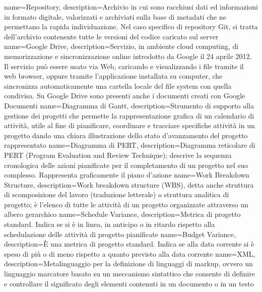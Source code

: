  {
	name=Repository,
	description={Archivio in cui sono racchiusi dati ed informazioni in formato digitale,
	valorizzati e archiviati sulla base di metadati che ne permettano la rapida individuazione.
	Nel caso specifico di repository Git, si tratta dell'archivio contenente tutte le versioni
	del codice caricato sul server}
}
 {
	name=Google Drive,
	description={Servizio, in ambiente cloud computing, di memorizzazione e sincronizzazione
	online introdotto da Google il 24 aprile 2012. Il servizio può essere usato via Web, caricando
	e visualizzando i file tramite il web browser, oppure tramite l'applicazione installata su
	computer, che sincronizza automaticamente una cartella locale del file system con quella
	condivisa. Su Google Drive sono presenti anche i documenti creati con Google Documenti}
}
 {
	name=Diagramma di Gantt,
	description={Strumento di supporto alla gestione dei progetti che permette la rappresentazione
	grafica di un calendario di attività, utile al fine di pianificare, coordinare e tracciare
	specifiche attività in un progetto dando una chiara illustrazione dello stato d'avanzamento
	del progetto rappresentato}
}
 {
	name=Diagramma di PERT,
	description={Diagramma reticolare di PERT (Program Evaluation and Review Technique); descrive
	la sequenza cronologica delle azioni pianificate per il completamento di un progetto nel suo
	complesso. Rappresenta graficamente il piano d'azione}
}
 {
	name=Work Breakdown Structure,
	description={Work breakdown structure (WBS), detta anche struttura di scomposizione del lavoro
	(traduzione letterale) o struttura analitica di progetto; è l'elenco di tutte le attività di un
	progetto organizzate attraverso un albero gerarchico}
}
 {
	name=Schedule Variance,
	description={Metrica di progetto standard. Indica se si è in linea, in anticipo o in ritardo
	rispetto alla schedulazione delle attività di progetto pianificate}
}
 {
	name=Budget Variance,
	description={È una metrica di progetto standard. Indica se alla data corrente si è speso di
	più o di meno rispetto a quanto previsto alla data corrente}
}
 {
	name=XML,
	description={Metalinguaggio per la definizione di linguaggi di markup, ovvero un linguaggio
	marcatore basato su un meccanismo sintattico che consente di definire e controllare il
	significato degli elementi contenuti in un documento o in un testo}
}
